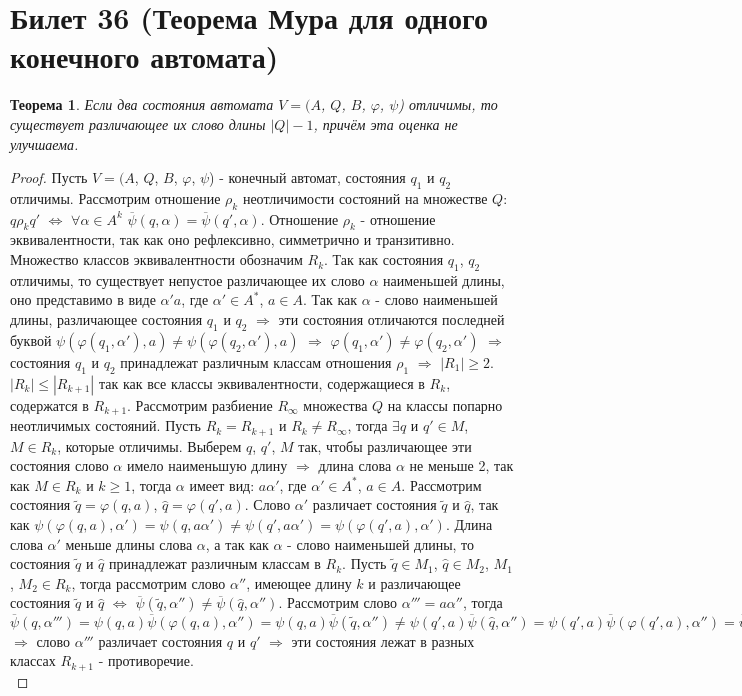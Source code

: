 \documentclass[a4paper, 12pt]{article}
\renewcommand{\phi}{\varphi}
\theoremstyle{definition}
\theoremstyle{plain}
\newtheorem*{theorem}{Теорема}
\theoremstyle{remark}
\begin{document}
  \section{Билет 36 (Теорема Мура для одного конечного автомата)}
  \begin{theorem}
    Если два состояния автомата $V=(A$, $Q$, $B$, $\phi$, $\psi$) отличимы, то существует различающее их слово длины $|Q|-1$, причём эта оценка не улучшаема.
  \end{theorem}
  \begin{proof}
    Пусть $V=(A$, $Q$, $B$, $\phi$, $\psi$) - конечный автомат, состояния $q_1$ и $q_2$ отличимы. Рассмотрим отношение $\rho_k$ неотличимости состояний на множестве $Q$: $q\rho_kq'$ $\Leftrightarrow$ $\forall\alpha\in A^k$ $\overline{\psi}(q,\alpha)=\overline{\psi}(q',\alpha)$. Отношение $\rho_k$ - отношение эквивалентности, так как оно рефлексивно, симметрично и транзитивно. Множество классов эквивалентности обозначим $R_k$. Так как состояния $q_1$, $q_2$ отличимы, то существует непустое различающее их слово $\alpha$ наименьшей длины, оно представимо в виде $\alpha'a$, где $\alpha'\in A^*$, $a\in A$. Так как $\alpha$ - слово наименьшей длины, различающее состояния $q_1$ и $q_2$ $\Longrightarrow$ эти состояния отличаются последней буквой $\psi(\phi(q_1,\alpha'),a)\neq\psi(\phi(q_2,\alpha'),a)$ $\Longrightarrow$ $\phi(q_1,\alpha')\neq\phi(q_2,\alpha')$ $\Longrightarrow$ состояния $q_1$ и $q_2$ принадлежат различным классам отношения $\rho_1$ $\Longrightarrow$ $|R_1|\geqslant2$.\\
    $|R_k|\leqslant|R_{k+1}|$ так как все классы эквивалентности, содержащиеся в $R_k$, содержатся в $R_{k+1}$. Рассмотрим разбиение $R_{\infty}$ множества $Q$ на классы попарно неотличимых состояний. Пусть $R_k=R_{k+1}$ и $R_k\neq R_{\infty}$, тогда $\exists q$ и $q'\in M$, $M\in R_k$, которые отличимы. Выберем $q$, $q'$, $M$ так, чтобы различающее эти состояния слово $\alpha$ имело наименьшую длину $\Longrightarrow$ длина слова $\alpha$ не меньше 2, так как $M\in R_k$ и $k\geqslant1$, тогда $\alpha$ имеет вид: $a\alpha'$, где $\alpha'\in A^*$, $a\in A$. Рассмотрим состояния $\tilde{q}=\phi(q,a)$, $\widehat{q}=\phi(q',a)$. Слово $\alpha'$ различает состояния $\tilde{q}$ и $\widehat{q}$, так как $\psi(\phi(q,a),\alpha')=\psi(q,a\alpha')\neq\psi(q',a\alpha')=\psi(\phi(q',a),\alpha')$. Длина слова $\alpha'$ меньше длины слова $\alpha$, а так как $\alpha$ - слово наименьшей длины, то состояния $\tilde{q}$ и $\widehat{q}$ принадлежат различным классам в $R_k$. Пусть $\tilde{q}\in M_1$, $\widehat{q}\in M_2$, $M_1$, $M_2\in R_k$, тогда рассмотрим слово $\alpha''$, имеющее длину $k$ и различающее состояния $\tilde{q}$ и $\widehat{q}$ $\Leftrightarrow$ $\overline{\psi}(\tilde{q},\alpha'')\neq\overline{\psi}(\widehat{q},\alpha'')$. Рассмотрим слово $\alpha'''=a\alpha''$, тогда $\overline{\psi}(q,\alpha''')=\psi(q,a)\overline{\psi}(\phi(q,a),\alpha'')=\psi(q,a)\overline{\psi}(\tilde{q},\alpha'')\neq\psi(q',a)\overline{\psi}(\widehat{q},\alpha'')=\psi(q',a)\overline{\psi}(\phi(q',a),\alpha'')=\overline{\psi}(q',\alpha''')$ $\Longrightarrow$ слово $\alpha'''$ различает состояния $q$ и $q'$ $\Longrightarrow$ эти состояния лежат в разных классах $R_{k+1}$ - противоречие.\\

\end{proof}
\end{document}
